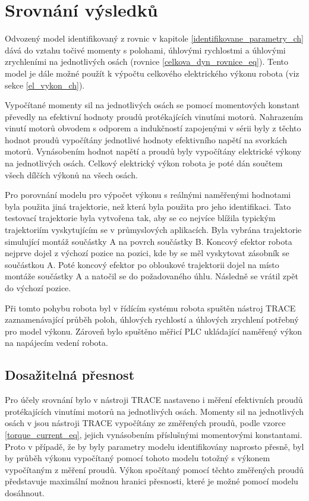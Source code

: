 \chapter{Srovnání výsledků}

Odvozený model identifikovaný z rovnic v kapitole \ref{identifikovane_parametry_ch} dává do vztahu točivé momenty s polohami, úhlovými rychlostmi a úhlovými zrychleními na jednotlivých osách (rovnice \ref{celkova_dyn_rovnice_eq}). Tento model je dále možné použít k výpočtu celkového elektrického výkonu robota (viz sekce \ref{el_vykon_ch}).

Vypočítané momenty sil na jednotlivých osách se pomocí momentových konstant převedly na efektivní hodnoty proudů protékajících vinutími motorů. Nahrazením vinutí motorů obvodem s odporem a indukčností zapojenými v sérii byly z těchto hodnot proudů vypočítány jednotlivé hodnoty efektivního napětí na svorkách motorů. Vynásobením hodnot napětí a proudů byly vypočítány elektrické výkony na jednotlivých osách. Celkový elektrický výkon robota je poté dán součtem všech dílčích výkonů na všech osách. 

Pro porovnání modelu pro výpočet výkonu s reálnými naměřenými hodnotami byla použita jiná trajektorie, než která byla použita pro jeho identifikaci. Tato testovací trajektorie byla vytvořena tak, aby se co nejvíce blížila typickým trajektoriím vyskytujícím se v průmyslových aplikacích. Byla vybrána trajektorie simulující montáž součástky A na povrch součástky B. Koncový efektor robota nejprve dojel z výchozí pozice na pozici, kde by se měl vyskytovat zásobník se součástkou A. Poté koncový efektor po obloukové trajektorii dojel na místo montáže součástky A a natočil se do požadovaného úhlu. Následně se vrátil zpět do výchozí pozice.

Při tomto pohybu robota byl v řídícím systému robota spuštěn nástroj TRACE zaznamenávající průběh poloh, úhlových rychlostí a úhlových zrychlení potřebný pro model výkonu. Zároveň bylo spuštěno měřicí PLC ukládající naměřený výkon na napájecím vedení robota. 

\section{Dosažitelná přesnost}
\label{dosaz_presnost_sec}
Pro účely srovnání bylo v nástroji TRACE nastaveno i měření efektivních proudů protékajících vinutími motorů na jednotlivých osách. Momenty sil na jednotlivých osách v jsou nástroji TRACE vypočítány ze změřených proudů, podle vzorce \ref{torque_current_eq}, jejich vynásobením příslušnými momentovými konstantami. Proto v případě, že by byly parametry modelu identifikovány naprosto přesně, byl by průběh výkonu vypočítaný pomocí tohoto modelu totožný s výkonem vypočítaným z měření proudů. Výkon spočítaný pomocí těchto změřených proudů představuje maximální možnou hranici přesnosti, které je možné pomocí modelu dosáhnout. 

